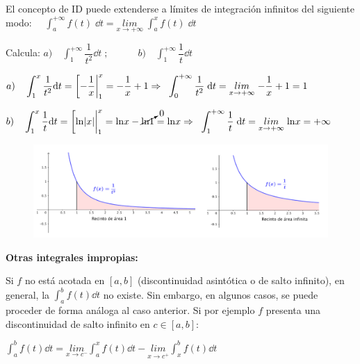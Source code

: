 El concepto de ID puede extenderse a límites de integración infinitos del siguiente modo:
$\quad \displaystyle \int_a^{+\infty} f(t)\; \dd t = \underset{x\to + \infty}{lim}\;{\int_a^x f(t)\; \dd t}$

\begin{ejem}
Calcula: $a) \quad \displaystyle \int_1^{+\infty} \dfrac {1}{t^2} \dd t\; ; \qquad \quad b) \quad \displaystyle \int_1^{+\infty} \dfrac 1 t \dd t $	

$a)\quad \displaystyle \int_1^x \dfrac {1}{t^2} \dd t= \eval[-\dfrac{1}{x}|_1^x=-\dfrac 1 x + 1 \Rightarrow \; \;  \displaystyle \int_0^{+\infty} \dfrac {1}{t^2}\; \dd t = \underset{x\to + \infty}{lim}\;{-\dfrac 1 x + 1}=1$

$b) \quad \displaystyle \int_1^x \dfrac 1 t \dd t = \eval[\mathrm{ln}\abs{x}|_1^x=\mathrm{ln}x-\cancelto{0}{\mathrm{ln}1}=\mathrm{ln}x \Rightarrow \;\; \displaystyle \int_1^{+\infty} \dfrac {1}{t}\; \dd t = \underset{x\to + \infty}{lim}\;{\mathrm{ln}x}=+\infty$

\begin{figure}[H]
 	\centering
	\includegraphics[width=1\textwidth]{imagenes/imagenes08/T08IM10.png}
\end{figure}

\end{ejem}

\vspace{-4mm} \textbf{Otras integrales impropias:}

Si $f$ no está acotada en $[a,b]$ (discontinuidad asintótica o de salto infinito), en general, la $\displaystyle \int_a^b f(t) \dd t$ no existe. Sin embargo, en algunos casos, se puede proceder de forma análoga al caso anterior. Si por ejemplo $f$ presenta una discontinuidad de salto infinito en $c\in[a,b]$:

$\displaystyle \int_a^b f(t) \dd t= \underset {x\to c^-}{lim}{\int_a^x f(t) \dd t}-\underset {x\to c^+}{lim}{\int_x^b f(t) \dd t}$


